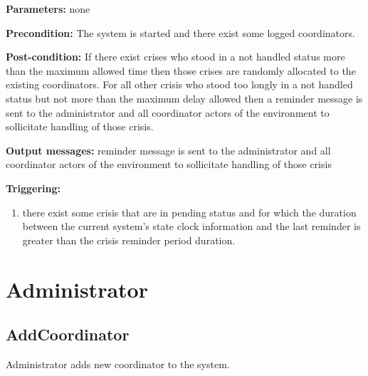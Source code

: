 \begin{description}

\item \textbf{Parameters:} none
\item \textbf{Precondition:} The system is started and there exist some
logged coordinators.
\item \textbf{Post-condition:} If there exist crises who
stood in a not handled status more than the maximum allowed time then those
crises are randomly allocated to the existing coordinators. For all other crisis
who stood too longly in a not handled status but not more than the maximum
delay allowed then a reminder message is sent to the administrator and all
coordinator actors of the environment to sollicitate handling of those crisis.
\item \textbf{Output messages:} reminder message is sent to the administrator
and all coordinator actors of the environment to sollicitate handling of those
crisis

\item \textbf{Triggering:}
\begin{enumerate} 
	\item there exist some crisis that are in pending status and for which the
	duration between the current system's state clock information and the last
	reminder is greater than the crisis reminder period duration.
\end{enumerate}

\end{description}

\section{Administrator}

\subsection{AddCoordinator}
\label{operation:addcoordinator}

Administrator adds new coordinator to the system.

